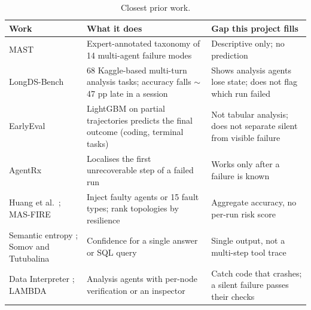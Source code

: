 \documentclass[10pt,twocolumn]{article}
\begin{document}
\begin{table}[t]
\caption{Closest prior work.}\label{tab:related}
\footnotesize
\begin{tabularx}{\textwidth}{@{}P{38mm}LL@{}}
\toprule
Work & What it does & Gap this project fills\\
\midrule
MAST \cite{cemri} & Expert-annotated taxonomy of 14 multi-agent failure modes & Descriptive only; no prediction\\
LongDS-Bench \cite{longds} & 68 Kaggle-based multi-turn analysis tasks; accuracy falls $\sim$47 pp late in a
  session & Shows analysis agents lose state; does not flag which run failed\\
EarlyEval \cite{earlyeval} & LightGBM on partial trajectories predicts the final outcome (coding, terminal tasks)
  & Not tabular analysis; does not separate silent from visible failure\\
AgentRx \cite{agentrx} & Localises the first unrecoverable step of a failed run & Works only after a failure is
  known\\
Huang et al.\ \cite{huang}; MAS-FIRE \cite{masfire} & Inject faulty agents or 15 fault types; rank topologies by
  resilience & Aggregate accuracy, no per-run risk score\\
Semantic entropy \cite{farquhar}; Somov and Tutubalina \cite{somov} & Confidence for a single answer or SQL query
  & Single output, not a multi-step tool trace\\
Data Interpreter \cite{datainterp}; LAMBDA \cite{lambda} & Analysis agents with per-node verification or an
  inspector & Catch code that crashes; a silent failure passes their checks\\
\bottomrule
\end{tabularx}
\end{table}
\end{document}
